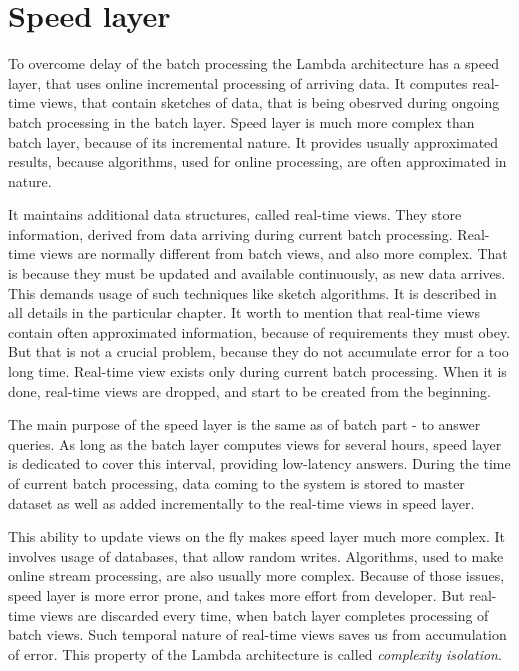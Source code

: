 \section{Speed layer}

To overcome delay of the batch processing the Lambda architecture has a speed layer, that uses online incremental processing of arriving data.
It computes real-time views, that contain sketches of data, that is being obesrved during ongoing batch processing in the batch layer.
Speed layer is much more complex than batch layer, because of its incremental nature.
It provides usually approximated results, because algorithms, used for online processing, are often approximated in nature.

It maintains additional data structures, called real-time views.
They store information, derived from data arriving during current batch processing.
Real-time views are normally different from batch views, and also more complex.
That is because they must be updated and available continuously, as new data arrives.
This demands usage of such techniques like sketch algorithms.
It is described in all details in the particular chapter.
It worth to mention that real-time views contain often approximated information, because of requirements they must obey.
But that is not a crucial problem, because they do not accumulate error for a too long time.
Real-time view exists only during current batch processing.
When it is done, real-time views are dropped, and start to be created from the beginning.

The main purpose of the speed layer is the same as of batch part - to answer queries.
As long as the batch layer computes views for several hours, speed layer is dedicated to cover this interval, providing low-latency answers.
During the time of current batch processing, data coming to the system is stored to master dataset as well as added incrementally to the real-time views in speed layer.

This ability to update views on the fly makes speed layer much more complex.
It involves usage of databases, that allow random writes.
Algorithms, used to make online stream processing, are also usually more complex.
Because of those issues, speed layer is more error prone, and takes more effort from developer.
But real-time views are discarded every time, when batch layer completes processing of batch views.
Such temporal nature of real-time views saves us from accumulation of error.
This property of the Lambda architecture is called \textit{complexity isolation}.

